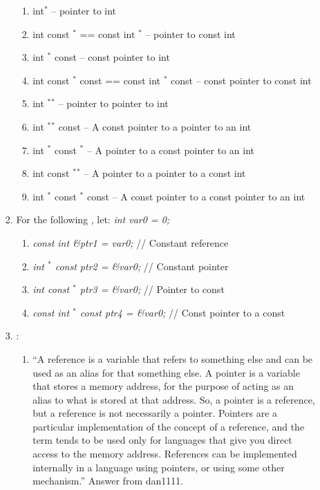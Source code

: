 \begin{enumerate}
\begin{enumerate}
\begin{enumerate}
\begin{enumerate}
			\item int$^{\ast}$ -- pointer to int
			\item int const $^{\ast}$ == const int $^{\ast}$ -- pointer to const int
			\item int $^{\ast}$ const -- const pointer to int
			\item int const $^{\ast}$ const == const int $^{\ast}$ const -- const pointer to const int
			\item int $^{\ast}$$^{\ast}$ -- pointer to pointer to int
			\item int $^{\ast}$$^{\ast}$ const -- A const pointer to a pointer to an int
			\item int $^{\ast}$ const $^{\ast}$ -- A pointer to a const pointer to an int
			\item int const $^{\ast}$$^{\ast}$ -- A pointer to a pointer to a const int
			\item int $^{\ast}$ const $^{\ast}$ const -- A const pointer to a const pointer to an int
			\end{enumerate}
		\item For the following \cite{Mortensen2015}, let: {\it int var0 = 0;} \vspace{-0.1cm}
			\begin{enumerate} \itemsep -1pt
			\item {\it const int {\rm \&}ptr1 = var0;} // Constant reference
			\item {\it int $^{\ast}$ const ptr2 = {\rm \&}var0;} // Constant pointer
			\item {\it int const $^{\ast}$ ptr3 = {\rm \&}var0;} // Pointer to const
			\item {\it const int $^{\ast}$ const ptr4 = {\rm \&}var0;} // Const pointer to a const
			\end{enumerate}
		\item \cite{Ozcan2013}: \vspace{-0.1cm}
			\begin{enumerate} \itemsep -1pt
			\item ``A reference is a variable that refers to something else and can be used as an alias for that something else. A pointer is a variable that stores a memory address, for the purpose of acting as an alias to what is stored at that address. So, a pointer is a reference, but a reference is not necessarily a pointer. Pointers are a particular implementation of the concept of a reference, and the term tends to be used only for languages that give you direct access to the memory address. References can be implemented internally in a language using pointers, or using some other mechanism.'' Answer from dan1111.

\end{enumerate}
\end{enumerate}
\end{enumerate}
\end{enumerate}
